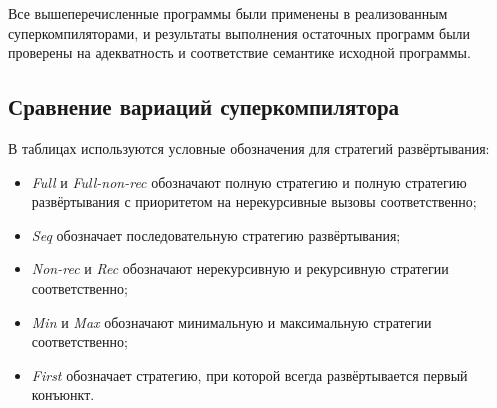 \begin{itemize}
\end{itemize}

Все вышеперечисленные программы были применены в реализованным суперкомпиляторами, и результаты
выполнения остаточных программ были проверены на адекватность и соответствие семантике исходной программы.

% 

\subsection{Сравнение вариаций суперкомпилятора \ukanren}

В таблицах используются условные обозначения для стратегий развёртывания:
\begin{itemize}
\item {\it Full} и {\it Full-non-rec} обозначают полную стратегию и полную стратегию развёртывания с приоритетом на нерекурсивные вызовы соответственно;
\item {\it Seq} обозначает последовательную стратегию развёртывания;
\item {\it Non-rec} и {\it Rec} обозначают нерекурсивную и рекурсивную стратегии соответственно;
\item {\it Min} и {\it Max} обозначают минимальную и максимальную стратегии соответственно;
\item {\it First} обозначает стратегию, при которой всегда развёртывается первый конъюнкт.
\end{itemize}

